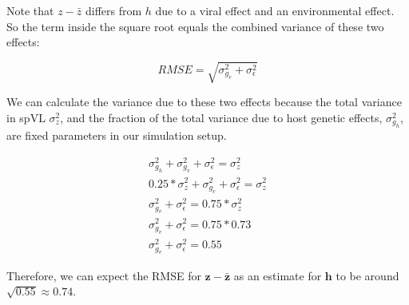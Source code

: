 \documentclass[]{article}
\begin{document}
\begin{doublespace}
Note that $z - \bar{z}$ differs from $h$ due to a viral effect and an environmental effect. So the term inside the square root equals the combined variance of these two effects:

\begin{equation}
    RMSE = \sqrt{\sigma^2_{g_v} + \sigma^2_\epsilon}
\end{equation}

We can calculate the variance due to these two effects because the total variance in spVL $\sigma^2_z$, and the fraction of the total variance due to host genetic effects, $\sigma^2_{g_h}$, are fixed parameters in our simulation setup.

\begin{equation}
\begin{split}
    \sigma^2_{g_h} + \sigma^2_{g_v} + \sigma^2_\epsilon = \sigma^2_z \\
    0.25 * \sigma^2_{z} + \sigma^2_{g_v} + \sigma^2_\epsilon = \sigma^2_z \\
    \sigma^2_{g_v} + \sigma^2_\epsilon = 0.75 * \sigma^2_z \\
    \sigma^2_{g_v} + \sigma^2_\epsilon = 0.75 * 0.73 \\
    \sigma^2_{g_v} + \sigma^2_\epsilon = 0.55
\end{split}
\end{equation}

Therefore, we can expect the RMSE for $\bm{z} - \bm{\bar{z}}$ as an estimate for $\bm{h}$ to be around $\sqrt{0.55} \approx 0.74$. 

\newpage

\begin{figure}[H]
\end{figure}
\end{doublespace}
\end{document}
